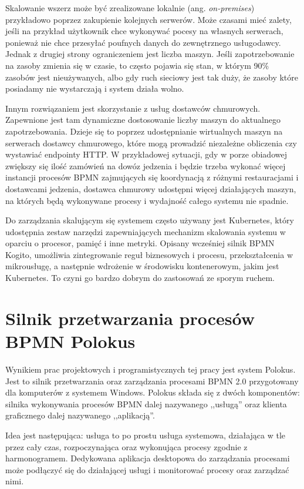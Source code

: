 \documentclass[declaration,shortabstract,mgr]{iithesis}
\newcommand{\bpmn}{BPMN }
\begin{document}
Skalowanie wszerz może być zrealizowane lokalnie (ang. \textit{on-premises}) przykładowo poprzez zakupienie kolejnych serwerów. Może czasami mieć zalety, jeśli na przykład użytkownik chce wykonywać pocesy na własnych serwerach, ponieważ nie chce przesyłać poufnych danych do zewnętrznego usługodawcy. Jednak z drugiej strony ograniczeniem jest liczba maszyn. Jeśli zapotrzebowanie na zasoby zmienia się w czasie, to często pojawia się stan, w którym 90\% zasobów jest nieużywanych, albo gdy ruch sieciowy jest tak duży, że zasoby które posiadamy nie wystarczają i system działa wolno.

Innym rozwiązaniem jest skorzystanie z usług dostawców chmurowych. Zapewnione jest tam dynamiczne dostosowanie liczby maszyn do  aktualnego zapotrzebowania. Dzieje się to poprzez udostępnianie wirtualnych maszyn na serwerach dostawcy chmurowego, które mogą prowadzić niezależne obliczenia czy wystawiać endpointy HTTP. W przykładowej sytuacji, gdy w porze obiadowej zwiększy się ilość zamówień na dowóz jedzenia i będzie trzeba wykonać więcej instancji procesów \bpmn zajmujących się koordynacją z różnymi restauracjami i dostawcami jedzenia, dostawca chmurowy udostępni więcej działających maszyn, na których będą wykonywane procesy i wydajność całego systemu nie spadnie.

Do zarządzania skalującym się systemem często używany jest Kubernetes, który udostępnia zestaw narzędzi zapewniających mechanizm skalowania systemu w oparciu o procesor, pamięć i inne metryki. Opisany wcześniej silnik \bpmn Kogito, umożliwia zintegrowanie reguł biznesowych i procesu, przekształcenia w mikrousługę, a następnie wdrożenie w środowisku kontenerowym, jakim jest Kubernetes. To czyni go bardzo dobrym do zastosowań ze sporym ruchem.


\chapter{Silnik przetwarzania procesów BPMN Polokus}\label{chapter-polokus}

Wynikiem prac projektowych i programistycznych tej pracy jest system Polokus. Jest to silnik przetwarzania oraz zarządzania procesami \bpmn 2.0 przygotowany dla komputerów z systemem Windows. Polokus składa się z dwóch komponentów: silnika wykonywania procesów \bpmn dalej nazywanego ,,usługą'' oraz klienta graficznego dalej nazywanego ,,aplikacją''. 

Idea jest następująca: usługa to po prostu usługa systemowa, działająca w tle przez cały czas, rozpoczynająca oraz wykonująca procesy zgodnie z harmonogramem. Dedykowana aplikacja desktopowa do zarządzania procesami może podłączyć się do działającej usługi i monitorować procesy oraz zarządzać nimi. 
\end{document}
